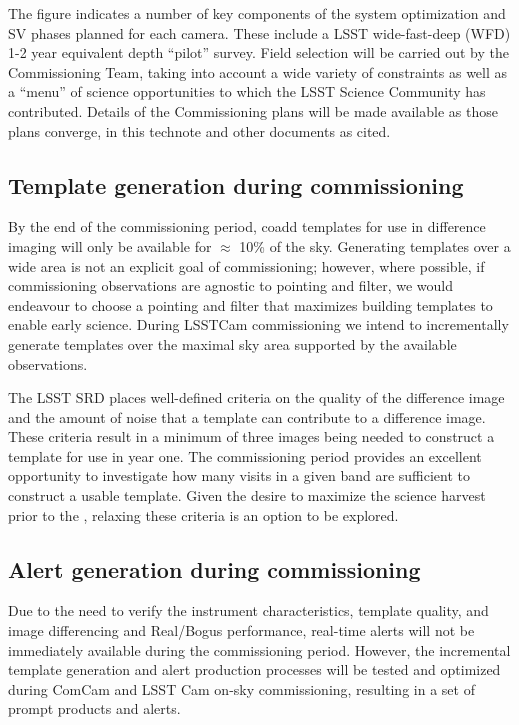 The figure indicates a number of key components of the system optimization and SV phases planned for each camera.
These include a LSST wide-fast-deep (WFD) 1-2 year equivalent depth ``pilot'' survey.
Field selection will be carried out by the Commissioning Team, taking into account a wide variety of constraints as well as a ``menu'' of science opportunities to which the LSST Science Community has contributed.
Details of the Commissioning plans will be made available as those plans converge, in this technote and other documents as cited.


\subsection{Template generation during commissioning}

By the end of the commissioning period, coadd templates for use in difference imaging will only be available for $\approx$ 10\% of the sky.
Generating templates over a wide area is not an explicit goal of commissioning;  however, where possible, if commissioning observations are agnostic to pointing and filter, we would endeavour to choose a pointing and filter that maximizes building templates to enable early science.
During LSSTCam commissioning we intend to incrementally generate templates over the maximal sky area supported by the available observations.

The LSST SRD places well-defined criteria on the quality of the difference image and the amount of noise that a template can contribute to a difference image.
These criteria result in a minimum of three images being needed to construct a template for use in year one.
The commissioning period provides an excellent opportunity to investigate how many visits in a given band are sufficient to construct a usable template.
Given the desire to maximize the science harvest prior to the \drone,  relaxing these criteria is an option to be explored.


\subsection{Alert generation during commissioning}

Due to the need to verify the instrument characteristics, template quality, and image differencing and Real/Bogus performance, real-time alerts will not be immediately available during the commissioning period.
However, the incremental template generation and alert production processes will be tested and optimized during ComCam and LSST Cam on-sky commissioning, resulting in a set of prompt products and alerts.

